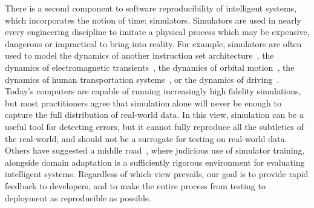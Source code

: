 There is a second component to software reproducibility of intelligent systems, which incorporates the notion of time: simulators. Simulators are used in nearly every engineering discipline to imitate a physical process which may be expensive, dangerous or impractical to bring into reality. For example, simulators are often used to model the dynamics of another instruction set architecture~\citep{bellard2005qemu}, the dynamics of electromagnetic transients~\citep{tavante2018opensi}, the dynamics of orbital motion~\citep{bellman1965wengert}, the dynamics of human transportation systems~\citep{ruch2018amodeus}, or the dynamics of driving~\citep{gym_duckietown}. Today's computers are capable of running increasingly high fidelity simulations, but most practitioners agree that simulation alone will never be enough to capture the full distribution of real-world data. In this view, simulation can be a useful tool for detecting errors, but it cannot fully reproduce all the subtleties of the real-world, and should not be a surrogate for testing on real-world data. Others have suggested a middle road~\citep{bousmalis2018using}, where judicious use of simulator training, alongside domain adaptation is a sufficiently rigorous environment for evaluating intelligent systems. Regardless of which view prevails, our goal is to provide rapid feedback to developers, and to make the entire process from testing to deployment as reproducible as possible.

%


